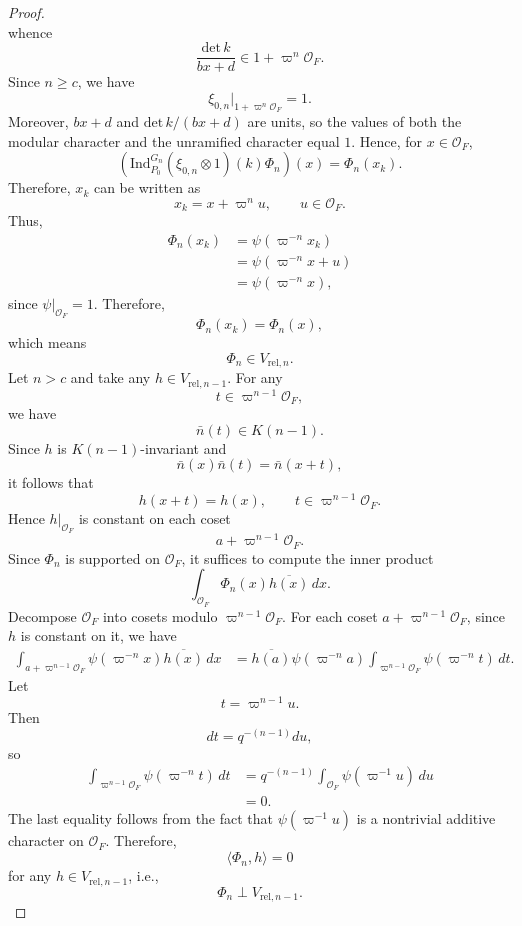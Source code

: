 \documentclass[11pt]{amsart}
\renewcommand{\rm}{\mathrm}
\theoremstyle{definition}
\numberwithin{equation}{section}
\begin{document}
\begin{proof}
\[		\]
		whence
		\[
		\frac{\rm{det}\, k}{bx+d} \in 1 + \varpi^n \mathcal{O}_F.
		\]
		Since \(n \geq c\), we have
		\[
		\xi_{0,n}|_{1+\varpi^n\mathcal{O}_F} = 1.
		\]
		Moreover, \(bx+d\) and \(\rm{det}\,k/(bx+d)\) are units, so the values of both the modular character and the unramified character equal \(1\). Hence, for \(x \in \mathcal{O}_F\),
		\[
		(\rm{Ind}_{P_0}^{G_n}(\xi_{0,n}\otimes 1)(k)\Phi_n)(x) = \Phi_n(x_k).
		\]
		Therefore, \(x_k\) can be written as
		\[
		x_k = x + \varpi^n u, \qquad u \in \mathcal{O}_F.
		\]
		Thus,
		\begin{align*}
			\Phi_n(x_k) &= \psi(\varpi^{-n}x_k) \\
			&= \psi(\varpi^{-n}x + u) \\
			&= \psi(\varpi^{-n}x),
		\end{align*}
		since \(\psi|_{\mathcal{O}_F} = 1\). Therefore,
		\[
		\Phi_n(x_k) = \Phi_n(x),
		\]which means \[\Phi_n\in V_{\rm{rel},n}.\]
		Let \(n > c\) and take any \(h \in V_{\rm{rel},n-1}\). For any
		\[
		t \in \varpi^{n-1}\mathcal{O}_F,
		\]
		we have
		\[
		\bar{n}(t) \in K(n-1).
		\]
		Since \(h\) is \(K(n-1)\)-invariant and
		\[
		\bar{n}(x)\bar{n}(t) = \bar{n}(x+t),
		\]
		it follows that
		\[
		h(x+t) = h(x), \qquad t \in \varpi^{n-1}\mathcal{O}_F.
		\]
		Hence \(h|_{\mathcal{O}_F}\) is constant on each coset
		\[
		a + \varpi^{n-1}\mathcal{O}_F.
		\]
		Since \(\Phi_n\) is supported on \(\mathcal{O}_F\), it suffices to compute the inner product
		\[
		\int_{\mathcal{O}_F} \Phi_n(x)\overline{h(x)}\,dx.
		\]
		Decompose \(\mathcal{O}_F\) into cosets modulo \(\varpi^{n-1}\mathcal{O}_F\). For each coset \(a + \varpi^{n-1}\mathcal{O}_F\), since \(h\) is constant on it, we have
		\begin{align*}
			\int_{a+\varpi^{n-1}\mathcal{O}_F} \psi(\varpi^{-n}x)\overline{h(x)}\,dx
			&= \overline{h(a)}\psi(\varpi^{-n}a) \int_{\varpi^{n-1}\mathcal{O}_F} \psi(\varpi^{-n}t)\,dt.
		\end{align*}
		Let
		\[
		t = \varpi^{n-1}u.
		\]
		Then
		\[
		dt = q^{-(n-1)}du,
		\]
		so
		\begin{align*}
			\int_{\varpi^{n-1}\mathcal{O}_F} \psi(\varpi^{-n}t)\,dt &= q^{-(n-1)} \int_{\mathcal{O}_F} \psi(\varpi^{-1}u)\,du \\
			&= 0.
		\end{align*}
		The last equality follows from the fact that \(\psi(\varpi^{-1}u)\) is a nontrivial additive character on \(\mathcal{O}_F\). Therefore,
		\[
		\langle \Phi_n, h \rangle = 0
		\]
		for any \(h \in V_{\rm{rel},n-1}\), i.e.,
		\[
		\Phi_n \perp V_{\rm{rel},n-1}.
\]
\end{proof}
\end{document}
